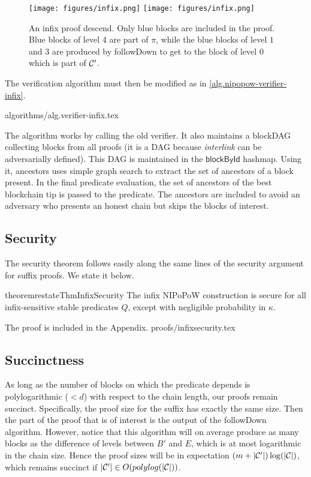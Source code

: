 \begin{figure}[h]
    \caption{An infix proof descend. Only blue blocks are included in the proof.
    Blue blocks of level $4$ are part of $\pi$, while the blue blocks of level
    $1$ and $3$ are produced by followDown to get to the block of level $0$
    which is part of $\mathcal{C}'$.}
    \centering
    \iftwocolumn
        \texttt{[image: figures/infix.png]}
    \else
        \texttt{[image: figures/infix.png]}
    \fi
    \label{fig.infix}
\end{figure}

The verification algorithm must then be modified as in
\ref{alg.nipopow-verifier-infix}.

{algorithms/alg.verifier-infix.tex}

The algorithm works by calling the old verifier. It also maintains a blockDAG
collecting blocks from all proofs (it is a DAG because \textit{interlink} can be
adversarially defined). This DAG is maintained in the $\textsf{blockById}$
hashmap. Using it, \textsf{ancestors} uses simple graph search to extract the
set of ancestors of a block present. In the final predicate evaluation, the set
of ancestors of the best blockchain tip is passed to the predicate. The
ancestors are included to avoid an adversary who presents an honest chain but
skips the blocks of interest.

\subsection{Security}
The security theorem follows easily along
the same lines of the security argument for suffix proofs. We state it below.
\begin{restatable}{theorem}{restateThmInfixSecurity}
\label{thm.infix-security}
The infix NIPoPoW construction is secure for all infix-sensitive stable
predicates $Q$, except with negligible probability in $\kappa$.
\end{restatable}
\iftwocolumn
The proof is included in the Appendix.
\else
{proofs/infixsecurity.tex}
\fi

\subsection{Succinctness}
As long as the number of blocks on which the predicate depends is
polylogarithmic ($< d$) with respect to the chain length, our proofs remain
succinct. Specifically, the proof size for the suffix has exactly the same size.
Then the part of the proof that is of interest is the output of the followDown
algorithm. However, notice that this algorithm will on average produce as many
blocks as the difference of levels between $B'$ and $E$, which is at most
logarithmic in the chain size. Hence the proof sizes will be in expectation $(m +
|\mathcal{C}'|)\log(|\mathcal{C}|)$, which remains succinct if $|\mathcal{C}'| \in
O(polylog(|\mathcal{C}|))$.
